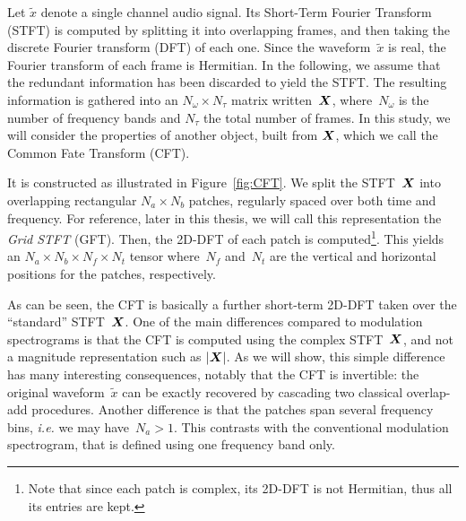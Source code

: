 Let $\tilde{x}$ denote a single channel audio signal.
Its Short-Term Fourier Transform (STFT) is computed by splitting it into overlapping frames, and then taking the discrete Fourier transform (DFT) of each one.
Since the waveform~$\tilde{x}$ is real, the Fourier transform of
each frame is Hermitian. In the following, we assume that the redundant
information has been discarded to yield the STFT.
The resulting information is gathered into an $N_{\omega}\times N_{\tau}$
matrix written~${\bm{X}}$, where~$N_{\omega}$ is the number of frequency
bands and $N_{\tau}$ the total number of frames.
In this study, we will consider the properties of another object, built from ${\bm{X}}$, which we call the Common Fate Transform (CFT).
\par
It is constructed as illustrated in Figure~\ref{fig:CFT}.
We split the STFT~${\bm{X}}$ into overlapping rectangular $N_{a}\times N_{b}$ patches, regularly spaced over both time and frequency.
For reference, later in this thesis, we will call this representation the \emph{Grid STFT} (GFT).
Then, the 2D-DFT of each patch is computed\footnote{Note that since each patch is complex, its 2D-DFT is not Hermitian, thus all its entries are kept.}.
This yields an $N_{a}\times N_{b}\times N_{f}\times N_{t}$ tensor where~$N_{f}$ and~$N_{t}$ are the vertical and horizontal positions for the patches, respectively.
\par
As can be seen, the CFT is basically a further short-term 2D-DFT taken over the ``standard'' STFT~${\bm{X}}$.
One of the main differences compared to modulation spectrograms is that the CFT is computed using the complex STFT~${\bm{X}}$, and not a magnitude representation such as $\left|{\bm{X}}\right|$.
As we will show, this simple difference has many interesting consequences, notably that the CFT is invertible: the original waveform~$\tilde{x}$ can be exactly recovered by cascading two classical overlap-add procedures.
Another difference is that the patches span several frequency bins, \emph{i.e.} we may have~$N_{a}>1$.
This contrasts with the conventional modulation spectrogram, that is defined using one frequency band only.

